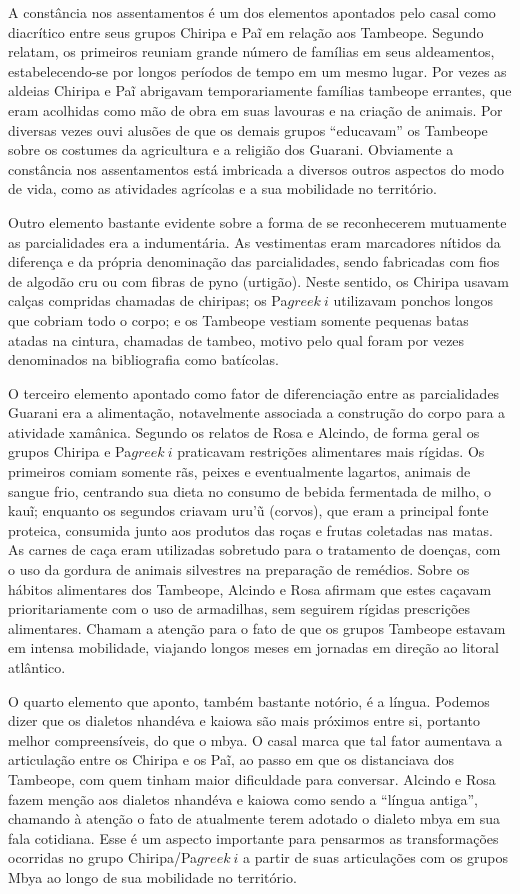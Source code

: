 A constância nos assentamentos é um dos elementos apontados pelo casal
como diacrítico entre seus grupos Chiripa e Paĩ
em relação aos Tambeope. Segundo relatam, os primeiros reuniam grande
número de famílias em seus aldeamentos, estabelecendo-se por longos
períodos de tempo em um mesmo lugar. Por vezes as aldeias Chiripa e
Paĩ abrigavam temporariamente famílias tambeope
errantes, que eram acolhidas como mão de obra em suas lavouras e na
criação de animais. Por diversas vezes ouvi alusões de que os demais
grupos ``educavam'' os Tambeope sobre os costumes da agricultura e a
religião dos Guarani. Obviamente a constância nos assentamentos está
imbricada a diversos outros aspectos do modo de vida, como as
atividades agrícolas e a sua mobilidade no território.

Outro elemento bastante evidente sobre a forma de se reconhecerem
mutuamente as parcialidades era a indumentária. As vestimentas eram
marcadores nítidos da diferença e da própria denominação das
parcialidades, sendo fabricadas com fios de algodão cru ou com fibras
de pyno (urtigão). Neste sentido, os Chiripa usavam calças compridas
chamadas de chiripas; os Pa${greek{~i}}$ utilizavam ponchos
longos que cobriam todo o corpo; e os Tambeope vestiam somente pequenas
batas atadas na cintura, chamadas de tambeo, motivo pelo qual foram por
vezes denominados na bibliografia como batícolas.

O terceiro elemento apontado como fator de diferenciação entre as
parcialidades Guarani era a alimentação, notavelmente associada a
construção do corpo para a atividade xamânica. Segundo os relatos de
Rosa e Alcindo, de forma geral os grupos Chiripa e
Pa${greek{~i}}$ praticavam restrições alimentares mais
rígidas. Os primeiros comiam somente rãs, peixes e eventualmente
lagartos, animais de sangue frio, centrando sua dieta no consumo de
bebida fermentada de milho, o kauĩ; enquanto os
segundos criavam uru’ũ (corvos), que eram a principal fonte proteica,
consumida junto aos produtos das roças e frutas coletadas nas matas. As
carnes de caça eram utilizadas sobretudo para o tratamento de doenças,
com o uso da gordura de animais silvestres na preparação de remédios.
Sobre os hábitos alimentares dos Tambeope, Alcindo e Rosa afirmam que
estes caçavam prioritariamente com o uso de armadilhas, sem seguirem
rígidas prescrições alimentares. Chamam a atenção para o fato de que os
grupos Tambeope estavam em intensa mobilidade, viajando longos meses em
jornadas em direção ao litoral atlântico. 

O quarto elemento que aponto, também bastante notório, é a língua.
Podemos dizer que os dialetos nhandéva e kaiowa são mais próximos entre
si, portanto melhor compreensíveis, do que o mbya. O casal marca que
tal fator aumentava a articulação entre os Chiripa e os
Paĩ, ao passo em que os distanciava dos Tambeope,
com quem tinham maior dificuldade para conversar. Alcindo e Rosa fazem
menção aos dialetos nhandéva e kaiowa como sendo a ``língua antiga'',
chamando à atenção o fato de atualmente terem adotado o dialeto mbya em
sua fala cotidiana. Esse é um aspecto importante para pensarmos as
transformações ocorridas no grupo Chiripa/Pa${greek{~i}}$ a
partir de suas articulações com os grupos Mbya ao longo de sua
mobilidade no território.

